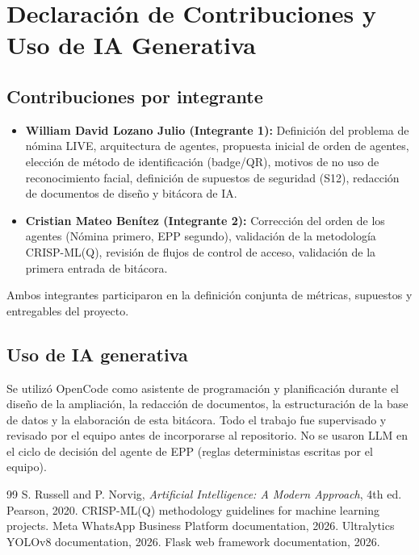 \documentclass[conference,spanish]{IEEEtran}
\begin{document}
\section{Declaración de Contribuciones y Uso de IA Generativa}
\subsection{Contribuciones por integrante}
\begin{itemize}
    \item \textbf{William David Lozano Julio (Integrante 1):} Definición del problema de nómina LIVE, arquitectura de agentes, propuesta inicial de orden de agentes, elección de método de identificación (badge/QR), motivos de no uso de reconocimiento facial, definición de supuestos de seguridad (S12), redacción de documentos de diseño y bitácora de IA.
    \item \textbf{Cristian Mateo Benítez (Integrante 2):} Corrección del orden de los agentes (Nómina primero, EPP segundo), validación de la metodología CRISP-ML(Q), revisión de flujos de control de acceso, validación de la primera entrada de bitácora.
\end{itemize}
Ambos integrantes participaron en la definición conjunta de métricas, supuestos y entregables del proyecto.

\subsection{Uso de IA generativa}
Se utilizó OpenCode como asistente de programación y planificación durante el diseño de la ampliación, la redacción de documentos, la estructuración de la base de datos y la elaboración de esta bitácora. Todo el trabajo fue supervisado y revisado por el equipo antes de incorporarse al repositorio. No se usaron LLM en el ciclo de decisión del agente de EPP (reglas deterministas escritas por el equipo).

\begin{thebibliography}{99}
 S. Russell and P. Norvig, \emph{Artificial Intelligence: A Modern Approach}, 4th ed. Pearson, 2020.
 CRISP-ML(Q) methodology guidelines for machine learning projects.
 Meta WhatsApp Business Platform documentation, 2026.
 Ultralytics YOLOv8 documentation, 2026.
 Flask web framework documentation, 2026.
\end{thebibliography}
\end{document}
